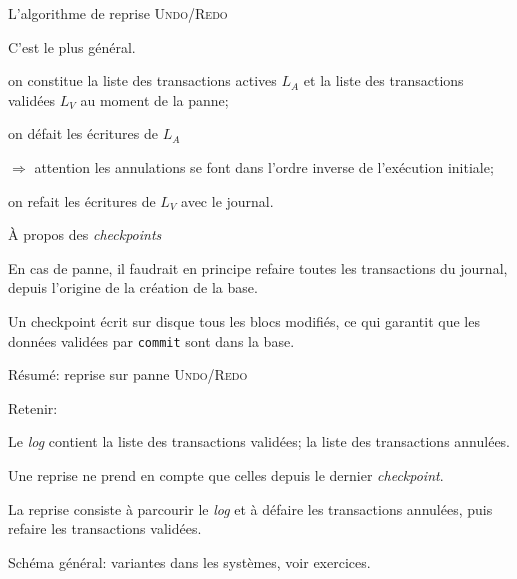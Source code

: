 \documentclass[aspectratio=169, handout]{beamer} %
\begin{document}
\begin{frame}{L'algorithme de reprise \textsc{Undo/Redo}}

C'est le plus général.

\begin{redbullet}
  \item on constitue la liste des transactions actives
       $L_A$ et la liste des transactions validées $L_V$
          au moment de la panne;

  \item on \alert{défait} les écritures de $L_A$ 
  
   $\Rightarrow$ attention
            les annulations se font dans l'ordre inverse de 
                l'exécution initiale;
                
   \item on \alert{refait} les écritures de $L_V$ avec le journal.
\end{redbullet}


\end{frame}


\begin{frame}{À propos des \textit{checkpoints}}


En cas de panne, il faudrait en principe refaire
toutes les transactions du journal, \alert{depuis l'origine
de la création de la base}.

\vfill

Un \alert{checkpoint} écrit sur disque tous les blocs
modifiés, ce qui garantit que les données validées par
\texttt{commit}
sont dans la base. 

\vfill


\end{frame}

\begin{frame}{Résumé: reprise sur panne \textsc{Undo/Redo}}

Retenir:

\vfill

\begin{redbullet}

  \item Le \textit{log} contient la liste des transactions
      validées; la liste des transactions annulées.
      
  \item Une reprise ne prend en compte que celles depuis le dernier \textit{checkpoint}.
  
  \item La reprise consiste à parcourir le \textit{log} et à \alert{défaire} les
     transactions annulées, puis \alert{refaire} les transactions validées.
 \end{redbullet}

\vfill

\begin{blocgauche}
Schéma général: variantes dans les systèmes, voir
exercices.
\end{blocgauche}
\end{frame}
\end{document}
